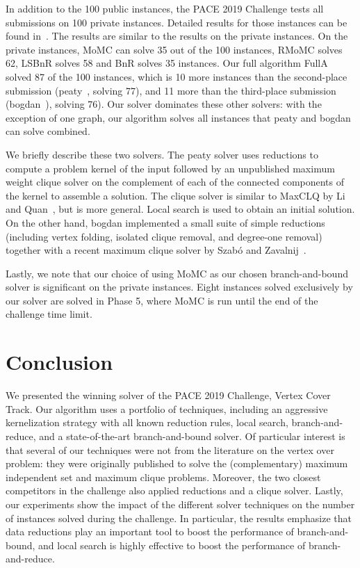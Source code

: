 \documentclass[twoside,leqno,twocolumn]{article}
\newcommand{\AlgName}[1]{\textsf{#1}}
\begin{document}
In addition to the 100 public instances, the PACE 2019 Challenge tests all submissions on 100 private instances. Detailed results for those instances can be found in~\cite{PACETR}. The results are similar to the results on the private instances. %
On the private instances, \AlgName{MoMC} can solve 35 out of the 100 instances, \AlgName{RMoMC} solves 62, \AlgName{LSBnR} solves 58 and \AlgName{BnR} solves 35 instances.
Our full algorithm \AlgName{FullA} solved 87 of the 100 instances, which is 10 more instances than the second-place submission (\textsf{peaty}~\cite{james_trimble_2019_3082356}, solving 77), and 11 more than the third-place submission (\textsf{bogdan}~\cite{zbogdan_2019_3228802}), solving 76). Our solver dominates these other solvers: with the exception of one graph, our algorithm solves all instances that \textsf{peaty} and \textsf{bogdan} can solve combined. 

We briefly describe these two solvers. The \textsf{peaty} solver uses reductions to compute a problem kernel of the input followed by an unpublished maximum weight clique solver on the complement of each of the connected components of the kernel to assemble a solution. The clique solver is similar to MaxCLQ by Li and Quan~\cite{DBLP:conf/aaai/LiQ10}, but is more general. Local search is used to obtain an initial solution. On the other hand, \textsf{bogdan} implemented a small suite of simple reductions (including vertex folding, isolated clique removal, and degree-one removal) together with a recent maximum clique solver by Szab\'o and Zavalnij~\cite{szabo2018different}. 

Lastly, we note that our choice of using MoMC as our chosen branch-and-bound solver is significant on the private instances. Eight instances solved exclusively by our solver are solved in Phase 5, where MoMC is run until the end of the challenge time limit.
\section{Conclusion}
We presented the winning solver of the PACE 2019 Challenge, Vertex Cover Track. Our algorithm uses a portfolio of techniques, including an aggressive kernelization strategy with all known reduction rules, local search, branch-and-reduce, and a state-of-the-art branch-and-bound solver. Of particular interest is that several of our techniques were not from the literature on the vertex over problem: they were originally published to solve the (complementary) maximum independent set and maximum clique problems. Moreover, the two closest competitors in the challenge also applied reductions and a clique solver. Lastly, our experiments show the impact of the different solver techniques on the number of instances solved during the challenge. In particular, the results emphasize that data reductions play an important tool to boost the performance of branch-and-bound, and local search is highly effective to boost the performance of branch-and-reduce.
\end{document}
